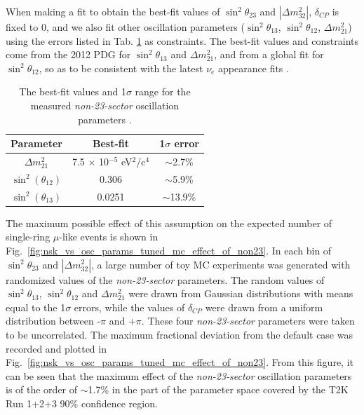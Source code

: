 When making a fit to obtain the best-fit values of
$\sin^{2}\theta_{23}$ and $|\Delta m^{2}_{32}|$,
$\delta_{CP}$ is fixed to 0,
and we also fit
other oscillation parameters ($\sin^2\theta_{13}$, $\sin^2\theta_{12}$, $\Delta m^2_{21}$)
using the errors listed in Tab. \ref{tab:pdg2012non23} as constraints.
The best-fit values and constraints come from the 2012 PDG \cite{PDG2012} for
$\sin^2\theta_{13}$ and $\Delta m^2_{21}$, and from a global fit \cite{FogliLisi}
for $\sin^2\theta_{12}$, so as to be consistent with the latest $\nu_e$ appearance fits
\cite{2013nuenergy,2013nueptheta}.
\begin{table}
\centering
\begin{tabular}{| c | c | c | }
\hline
Parameter                  &  Best-fit                                    & 1$\sigma$ error  \\
\hline
$\Delta m_{21}^{2}$      &  7.5 $\times$ 10$^{-5}$ eV$^{2}$/c$^{4}$     & $\sim$2.7\% \\
$\sin^{2}(\theta_{12})$  &  0.306                                       & $\sim$5.9\% \\
$\sin^{2}(\theta_{13})$  &  0.0251                                      & $\sim$13.9\% \\
\hline
\end{tabular}
\caption{
  The best-fit values and 1$\sigma$ range for the measured \emph{non-23-sector} oscillation parameters \cite{PDG2012,FogliLisi}.
}
\label{tab:pdg2012non23}
\end{table}
The maximum possible effect of this assumption on the expected number of single-ring $\mu$-like events is shown
in Fig.\ \ref{fig:nsk_vs_osc_params_tuned_mc_effect_of_non23}.
In each bin of $\sin^{2}{\theta_{23}}$ and $|\Delta m^{2}_{32}|$,
a large number of toy MC experiments was generated with randomized values of the \emph{non-23-sector} parameters.
The random values of $\sin^{2}\theta_{13}$, $\sin^{2}\theta_{12}$ and $\Delta m^{2}_{21}$ were drawn from
Gaussian distributions with means equal to the 1$\sigma$
errors, while the values of $\delta_{CP}$ were drawn from a uniform distribution between -$\pi$ and +$\pi$.
These four \emph{non-23-sector} parameters were taken to be uncorrelated.
The maximum fractional deviation from the default case was recorded and plotted
in Fig.\ \ref{fig:nsk_vs_osc_params_tuned_mc_effect_of_non23}.
From this figure, it can be seen that the maximum effect of the \emph{non-23-sector} oscillation parameters
is of the order of $\sim$1.7\% in the part of
the parameter space covered by the T2K Run 1+2+3 90\% confidence region.

